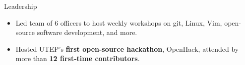 \documentclass{resume} %
\begin{document}
\begin{workSection}{Leadership}
    
    \customItem[
    	title=President \& Founder - \href{https://www.instagram.com/foss.utep/}{\textbf{Free and Open Source Software Club at UTEP} \faExternalLink},
    	duration=December 2023 - Present
    ]
    \begin{itemize}
    	\vspace{-0.5em}
    	\itemsep -6pt {}
    	\item Led team of 6 officers to host weekly workshops on git, Linux, Vim, open-source software development, and more.
		\item Hosted UTEP's \textbf{first open-source hackathon}, OpenHack, attended by more than \textbf{12 first-time contributors}.
    \end{itemize}


\end{workSection}
\end{document}
